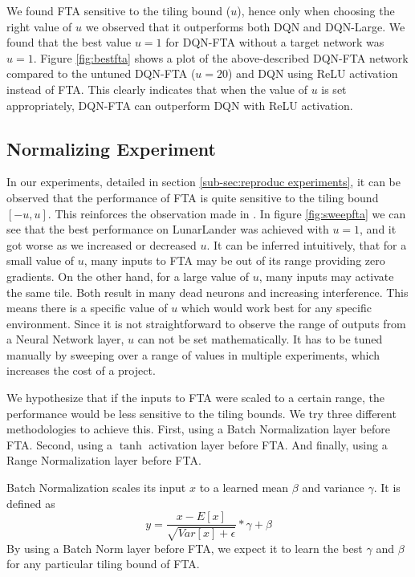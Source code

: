 \documentclass{article}
\begin{document}
We found FTA sensitive to the tiling bound ($u$), hence only when choosing the right value of $u$ we observed that it outperforms both DQN and DQN-Large.
We found that the best value $u=1$ for DQN-FTA without a target network was $u=1$.
Figure \ref{fig:bestfta} shows a plot of the above-described DQN-FTA network compared to the untuned DQN-FTA ($u=20$) and DQN using ReLU activation instead of FTA.
This clearly indicates that when the value of $u$ is set appropriately, DQN-FTA can outperform DQN with ReLU activation.


\subsection{Normalizing Experiment} \label{sub-sec:normalize experiments}
In our experiments, detailed in section \ref{sub-sec:reproduc experiments}, it can be observed that the performance of FTA is quite sensitive to the tiling bound $[-u, u]$.
This reinforces the observation made in \cite{pan2019fuzzy}.
In figure \ref{fig:sweepfta} we can see that the best performance on LunarLander was achieved with $u=1$, and it got worse as we increased or decreased $u$.
It can be inferred intuitively, that for a small value of $u$, many inputs to FTA may be out of its range providing zero gradients.
On the other hand, for a large value of $u$, many inputs may activate the same tile.
Both result in many dead neurons and increasing interference.
This means there is a specific value of $u$ which would work best for any specific environment.
Since it is not straightforward to observe the range of outputs from a Neural Network layer, $u$ can not be set mathematically.
It has to be tuned manually by sweeping over a range of values in multiple experiments, which increases the cost of a project.

We hypothesize that if the inputs to FTA were scaled to a certain range, the performance would be less sensitive to the tiling bounds.
We try three different methodologies to achieve this.
First, using a Batch Normalization \cite[]{ioffe2015batch} layer before FTA.
Second, using a $\tanh$ activation layer before FTA.
And finally, using a Range Normalization layer before FTA.

Batch Normalization scales its input $x$ to a learned mean $\beta$ and variance $\gamma$.
It is defined as
\begin{equation}
    y = \frac{x-E[x]}{\sqrt{Var[x] + \epsilon}} * \gamma + \beta
    \label{eq:batchnorm}
\end{equation}
By using a Batch Norm layer before FTA, we expect it to learn the best $\gamma$ and $\beta$ for any particular tiling bound of FTA.
\end{document}
